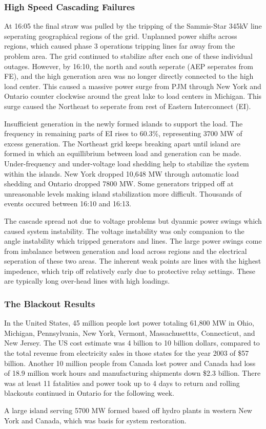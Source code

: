 \subsubsection{High Speed Cascading Failures}
At 16:05 the final straw was pulled by the tripping of the Sammis-Star 345kV line seperating geographical regions of the grid.  Unplanned power shifts across regions, which caused phase 3 operations tripping lines far away from the problem area.  The grid continued to stabilize after each one of these individual outages.  However, by 16:10, the north and south seperate (AEP seperates from FE), and the high generation area was no longer directly connected to the high load center.  This caused a massive power surge from PJM through New York and Ontario counter clockwise around the great lake to load centers in Michigan. This surge caused the Northeast to seperate from rest of Eastern Interconnect (EI).

Insufficient generation in the newly formed islands to support the load.  The frequency in remaining parts of EI rises to 60.3\%, representing 3700 MW of excess generation.  The Northeast grid keeps breaking apart until island are formed in which an equillibrium between load and generation can be made.  Under-frequency and under-voltage load shedding help to stabilize the system within the islands.  New York dropped 10,648 MW through automatic load shedding and Ontario dropped 7800 MW.  Some generators tripped off at unreasonable levels making island stabilization more difficult.  Thousands of events occured between 16:10 and 16:13.  

The cascade spread not due to voltage problems but dyanmic power swings which caused system instability.  The voltage instability was only companion to the angle instability which tripped generators and lines.  The large power swings come from imbalance between generation and load across regions and the electrical seperation of these two areas.  The inherent weak points are lines with the highest impedence, which trip off relatively early due to protective relay settings.  These are typically long over-head lines with high loadings.


\subsubsection{The Blackout Results}
In the United States, 45 million people lost power totaling 61,800 MW in Ohio, Michigan, Pennsylvania, New York, Vermont, Massachusettts, Connecticut, and New Jersey.  The US cost estimate was 4 billion to 10 billion dollars, compared to the total revenue from electricity sales in those states for the year 2003 of \$57 billion.  Another 10 million people from Canada lost power and Canada had loss of 18.9 million work hours and manufacturing shipments down \$2.3 billion.   There was at least 11 fatalities and power took up to 4 days to return and rolling blackouts continued in Ontario for the following week.

A large island serving 5700 MW formed based off hydro plants in western New York and Canada, which was basis for system restoration.


